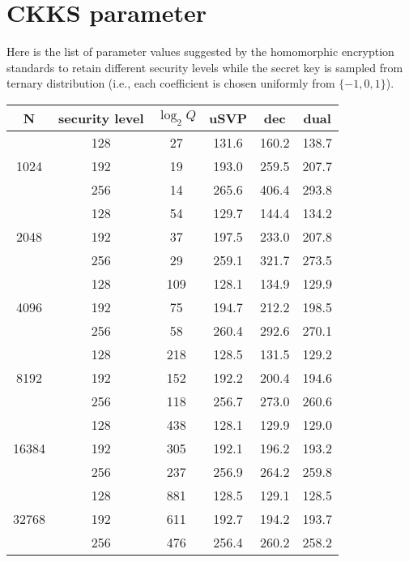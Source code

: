 \documentclass[a4paper,10pt]{article}
\begin{document}
\section{CKKS parameter} 

Here is the list of parameter values suggested by the homomorphic encryption standards to retain different security levels while the secret key is sampled from ternary distribution (i.e., each coefficient is chosen uniformly from $\{-1,0,1\}$).




\begin{center}
\begin{table}[h]
\begin{tabular}{|c|c|c|c|c|c|}
\hline
N  &  security level & $\log_2 {Q}$ &  uSVP & dec & dual  \\

\hline
\multirow{3}{4em}{1024} & 128 & 27 & 131.6 & 160.2 & 138.7  \\
                        & 192 & 19 & 193.0 & 259.5 & 207.7  \\
                        & 256 & 14 & 265.6 & 406.4 & 293.8  \\
\hline
\multirow{3}{4em}{2048} & 128 & 54 & 129.7 & 144.4 & 134.2 	\\
                        & 192 & 37 & 197.5 & 233.0 & 207.8  \\
                        & 256 & 29 & 259.1 & 321.7 & 273.5  \\
\hline
\multirow{3}{4em}{4096} & 128 & 109 & 128.1 & 134.9 & 129.9 \\
                        & 192 & 75  & 194.7 & 212.2 & 198.5 \\
                        & 256 & 58  & 260.4 & 292.6 & 270.1 \\
\hline
\multirow{3}{4em}{8192} & 128 & 218 & 128.5 & 131.5 & 129.2 \\
                        & 192 & 152 & 192.2 & 200.4 & 194.6 \\
                        & 256 & 118 & 256.7 & 273.0 & 260.6 \\
\hline
\multirow{3}{4em}{16384} & 128 & 438 & 128.1 & 129.9 & 129.0 \\
                         & 192 & 305 & 192.1 & 196.2 & 193.2 \\
                         & 256 & 237 & 256.9 & 264.2 & 259.8 \\
\hline
\multirow{3}{4em}{32768} & 128 & 881 & 128.5 & 129.1 & 128.5 \\
                         & 192 & 611 & 192.7 & 194.2 & 193.7 \\
                         & 256 & 476 & 256.4 & 260.2 & 258.2 \\
\hline


\end{tabular}
\end{table}
\end{center}
\end{document}
